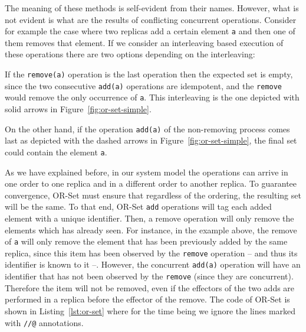 The meaning of these methods is self-evident from their names.
%
However, what is not evident is what are the results of conflicting
concurrent operations.
%
Consider for example the case where two replicas add a certain element
\lstinline|a| and then one of them removes that element.
%
If we consider an interleaving based execution of these operations
there are two options depending on the interleaving:
\begin{inparaenum}[i)]
\item If the \lstinline|remove(a)| operation is the last operation
  then the expected set is empty, since the two consecutive
  \lstinline|add(a)| operations are idempotent, and the
  \lstinline|remove| would remove the only occurrence of
  \lstinline|a|. This interleaving is the one depicted with solid
  arrows in Figure~\ref{fig:or-set-simple}.
\item On the other hand, if the operation \lstinline|add(a)| of the
  non-removing process comes last as depicted with the dashed arrows
  in Figure~\ref{fig:or-set-simple}, the final set could contain the
  element \lstinline|a|.
\end{inparaenum}
As we have explained before, in our system model the operations can
arrive in one order to one replica and in a different order to another
replica.
%
To guarantee convergence, OR-Set must ensure that regardless of the
ordering, the resulting set will be the same.
%
To that end, OR-Set \lstinline|add| operations will tag each added
element with a unique identifier.
%
Then, a remove operation will only remove the elements which has
already seen.
%
For instance, in the example above, the remove of \lstinline|a| will
only remove the element that has been previously added by the same
replica, since this item has been observed by the \lstinline|remove|
operation -- and thus its identifier is known to it --. However, the
concurrent \lstinline|add(a)| operation will have an identifier that
has not been observed by the \lstinline|remove| (since they are
concurrent).
%
Therefore the item will not be removed, even if the
effectors of the two adds are performed in a replica before the effector
of the remove.
%
The code of OR-Set is shown in Listing~\ref{lst:or-set} where for the time
being we ignore the lines marked with \lstinline|//@| annotations.


